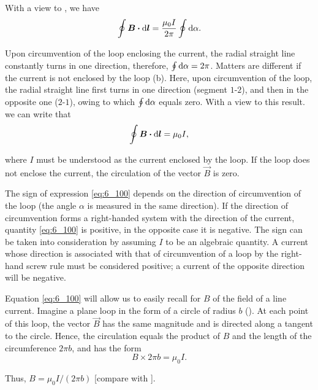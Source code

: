 With a view to , we have
\begin{equation}\label{eq:6_99}
    \oint \boldsymbol{B} \boldsymbol{\cdot} \mathrm{d}\boldsymbol{l} = \frac{\mu_0 I}{2\pi} \oint \mathrm{d}\alpha.
\end{equation}

\noindent
Upon circumvention of the loop enclosing the current, the radial straight line constantly turns in one direction, therefore, $\oint\mathrm{d}\alpha= 2\pi$. Matters are different if the current is not enclosed by the loop (b). Here, upon circumvention of the loop, the radial straight line first turns in one direction (segment $1$-$2$), and then in the opposite one ($2$-$1$), owing to which $\oint\mathrm{d}\alpha$ equals zero. With a view to this result. we can write that
\begin{equation}\label{eq:6_100}
    \oint \boldsymbol{B} \boldsymbol{\cdot} \mathrm{d}\boldsymbol{l} = \mu_0 I,
\end{equation}

\noindent
where $I$ must be understood as the current enclosed by the loop. If the loop does not enclose the current, the circulation of the vector $\vec{B}$ is zero.

The sign of expression \eqref{eq:6_100} depends on the direction of circumvention of the loop (the angle $\alpha$ is measured in the same direction). If the direction of circumvention forms a right-handed system with the direction of the current, quantity \eqref{eq:6_100} is positive, in the opposite case it is negative. The sign can be taken into consideration by assuming $I$ to be an algebraic quantity. A current whose direction is associated with that of circumvention of a loop by the right-hand screw rule must be considered positive; a current of the opposite direction will be negative.

Equation \eqref{eq:6_100} will allow us to easily recall  for $B$ of the field of a line current. Imagine a plane loop in the form of a circle of radius $b$ (). At each point of this loop, the vector $\vec{B}$ has the same magnitude and is directed along a tangent to the circle. Hence, the circulation equals the product of $B$ and the length of the circumference $2\pi b$, and  has the form
\begin{equation*}
    B \times 2\pi b = \mu_0 I.
\end{equation*}

\noindent
Thus, $B=\mu_0 I/(2\pi b)$ [compare with ].

